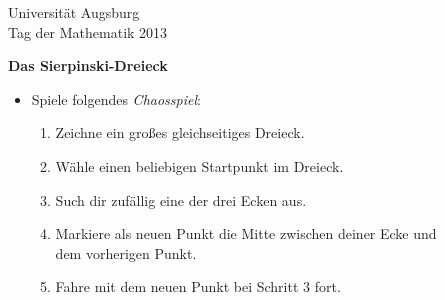 \documentclass[a4paper,ngerman]{scrartcl}
\newcommand{\drawHere}{%
  \begin{center}%
    \fbox{\parbox[c][0.9\textwidth]{0.9\textwidth}{\ }}%
  \end{center}}
\newcommand{\header}{%
  \begin{raggedleft}
  \tiny Universität Augsburg \\
  Tag der Mathematik 2013 \par
  \end{raggedleft}}
\begin{document}
\newpage

\header

\begin{center}
  \Huge\bf
  Das Sierpinski-Dreieck
\end{center}

\vfill
\drawHere

\vfill
\Large

\renewcommand{\labelitemi}{$\blacktriangle$}

\begin{itemize}
  \item Spiele folgendes \emph{Chaosspiel}:
  \begin{enumerate}
    \item Zeichne ein großes gleichseitiges Dreieck.
    \item Wähle einen beliebigen Startpunkt im Dreieck.
    \item Such dir zufällig eine der drei Ecken aus.
    \item Markiere als neuen Punkt die Mitte zwischen deiner Ecke und \\ dem
    vorherigen Punkt.
    \item Fahre mit dem neuen Punkt bei Schritt 3 fort.
  \end{enumerate}
\end{itemize}
\end{document}
